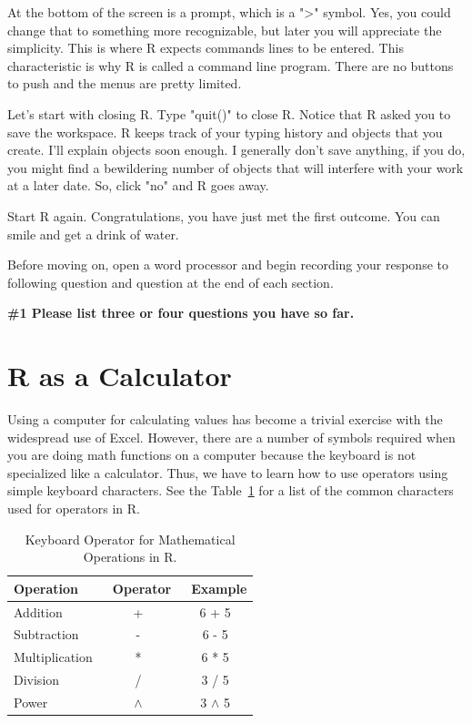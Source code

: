 \documentclass{tufte-handout}\usepackage[]{graphicx}\usepackage[]{xcolor}
\begin{document}
At the bottom of the screen is a prompt, which is a ">" symbol. Yes, you could change that to something more recognizable, but later you will appreciate the simplicity. This is where R expects commands lines to be entered. This characteristic is why R is called a command line program. There are no buttons to push and the menus are pretty limited.
  
Let's start with closing R.  Type "quit()" to close R. Notice that R asked you to save the workspace. R keeps track of your typing history and objects that you create. I'll explain objects soon enough. I generally don't save anything, if you do, you might find a bewildering number of objects that will interfere with your work at a later date. So, click "no" and R goes away.

Start R again. Congratulations, you have just met the first outcome. You can smile and get a drink of water.

Before moving on, open a word processor and begin recording your response to following question and question at the end of each section.

\bigskip
\noindent \textbf{\#1 Please list three or four questions you have so far. }

\section{R as a Calculator}

Using a computer for calculating values has become a trivial exercise with the widespread use of Excel. However, there are a number of symbols required when you are doing math functions on a computer because the keyboard is not specialized like a calculator. Thus, we have to learn how to use operators using simple keyboard characters. See the Table~\ref{tab:KeyboardOperators} for a list of the common characters used for operators in R.

\begin{table}
	\begin{center}
	\begin{tabular}{lcc}
		\toprule
Operation &\ Operator &\ Example \\
\midrule
Addition & + &  6 + 5  \\  
Subtraction & - & 6 - 5 \\
Multiplication & * & 6 * 5 \\
Division & / & 3 / 5\\
Power & $\wedge$ & 3 $\wedge$ 5  \\
\bottomrule
\end{tabular}
\end{center}	
\caption{Keyboard Operator for Mathematical Operations in R.}
	\label{tab:KeyboardOperators}
\end{table}
\end{document}

